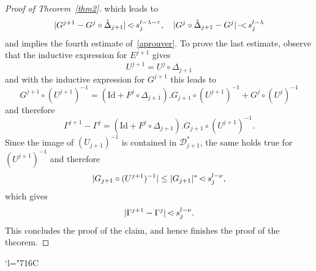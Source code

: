 \documentclass[JEP,XML,SOM,Unicode]{cedram}
\let\mathcal\mathscr
\newcommand{\Changelback}{\mathcode`l="716C}
\numberwithin{equation}{section}
\theoremstyle{plain}
\theoremstyle{definition}
\newcommand\MP{\,{<\hspace{-.5em}\cdot}\,}
\newcommand\PM{\,{\cdot\hspace{-.3em}<}\,}
\begin{document}
\begin{proof}[Proof of Theorem~\ref{thm2}]
which leads to
\begin{equation*}
|G^{j+1}-G^j \circ \hat{\Delta}_{j+1}| \MP s_j^{l-\lambda-\tau}, \quad
|G^j \circ \hat{\Delta}_{j+1}-G^j| \PM s_j^{l-\lambda}
\end{equation*}
and implies the fourth estimate of~\eqref{aprouver}. To prove the last estimate, observe that the inductive expression for $E^{j+1}$ gives
\[ U^{j+1}=U^j \circ \Delta_{j+1} \]
and with the inductive expression for $G^{j+1}$ this leads to
\[ G^{j+1} \circ (U^{j+1})^{-1}=(\mathrm{Id}+F^j \circ \Delta_{j+1}).G_{j+1} \circ (U^{j+1})^{-1}+G^j\circ (U^{j})^{-1} \]
and therefore
\[ \Gamma^{j+1}-\Gamma^j=(\mathrm{Id}+F^j \circ \Delta_{j+1}).G_{j+1} \circ (U^{j+1})^{-1}. \]
Since the image of $(U_{j+1})^{-1}$ is contained in $\mathcal{D}_{j+1}^*$, the same holds true for $(U^{j+1})^{-1}$ and therefore
\[ |G_{j+1} \circ (U^{j+1})^{-1}| \leq |G_{j+1}|^* \MP s_j^{l-\nu}, \]
which gives
\[ |\Gamma^{j+1}-\Gamma^j| \MP s_j^{l-\nu}. \]
This concludes the proof of the claim, and hence finishes the proof of the theorem.
\end{proof}

\Changelback
\backmatter


\end{document}
